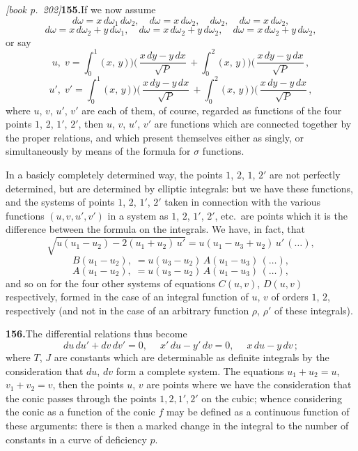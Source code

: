 \documentclass[11pt,a4paper]{article}
\begin{document}
\medskip\noindent\textit{[book p.~202]}\quad \textbf{155.}\quad If we now assume
\[
d\omega = x\,d\omega_1\,d\omega_2,\quad d\omega = x\,d\omega_2,\quad d\omega_2,\quad d\omega = x\,d\omega_2,
\]
\[
d\omega = x\,d\omega_2 + y\,d\omega_1,\quad d\omega = x\,d\omega_2 + y\,d\omega_2,\quad d\omega = x\,d\omega_2 + y\,d\omega_2,
\]
or say
\[
u,\;v = \int_0^1\,\bigl(\,x,\,y\,\bigr)\!\,\mbox{$)\!($}\,\frac{x\,dy - y\,dx}{\sqrt{P}}\,+ \int_0^2\,\bigl(\,x,\,y\,\bigr)\!\,\mbox{$)\!($}\,\frac{x\,dy - y\,dx}{\sqrt{P}}\,,
\]
\[
u',\;v' = \int_0^1\,\bigl(\,x,\,y\,\bigr)\!\,\mbox{$)\!($}\,\frac{x\,dy - y\,dx}{\sqrt{P}}\,+ \int_0^2\,\bigl(\,x,\,y\,\bigr)\!\,\mbox{$)\!($}\,\frac{x\,dy - y\,dx}{\sqrt{P}}\,,
\]
where $u$, $v$, $u'$, $v'$ are each of them, of course, regarded as functions of the four points $1$, $2$, $1'$, $2'$, then $u$, $v$, $u'$, $v'$ are functions which are connected together by the proper relations, and which present themselves either as singly, or simultaneously by means of the formula for $\sigma$ functions.

In a basicly completely determined way, the points $1$, $2$, $1$, $2'$ are not perfectly determined, but are determined by elliptic integrals: but we have these functions, and the systems of points $1$, $2$, $1'$, $2'$ taken in connection with the various functions $(u, v, u', v')$ in a system as $1$, $2$, $1'$, $2'$, etc.\ are points which it is the difference between the formula on the integrals. We have, in fact, that
\[
\sqrt{u(u_1 - u_2) - 2(u_1 + u_2)\,u'} = u(u_1 - u_3 + u_2)\,u'\,(\ldots),
\]
\[
B(u_1 - u_2),\;= u(u_3 - u_2)\,A(u_1 - u_3)\,(\ldots),
\]
\[
A(u_1 - u_2),\;= u(u_3 - u_2)\,A(u_1 - u_3)\,(\ldots),
\]
and so on for the four other systems of equations $C(u, v)$, $D(u, v)$ respectively, formed in the case of an integral function of $u$, $v$ of orders $1$, $2$, respectively (and not in the case of an arbitrary function $\rho$, $\rho'$ of these integrals).

\medskip\noindent\textbf{156.}\quad The differential relations thus become
\[
du\,du' + dv\,dv' = 0,\;\quad x'\,du - y'\,dv = 0,\;\quad x\,du - y\,dv\,;
\]
where $T$, $J$ are constants which are determinable as definite integrals by the consideration that $du$, $dv$ form a complete system. The equations $u_1 + u_2 = u$, $v_1 + v_2 = v$, then the points $u$, $v$ are points where we have the consideration that the conic passes through the points $1, 2, 1', 2'$ on the cubic; whence considering the conic as a function of the conic $f$ may be defined as a continuous function of these arguments: there is then a marked change in the integral to the number of constants in a curve of deficiency $p$.
\end{document}
